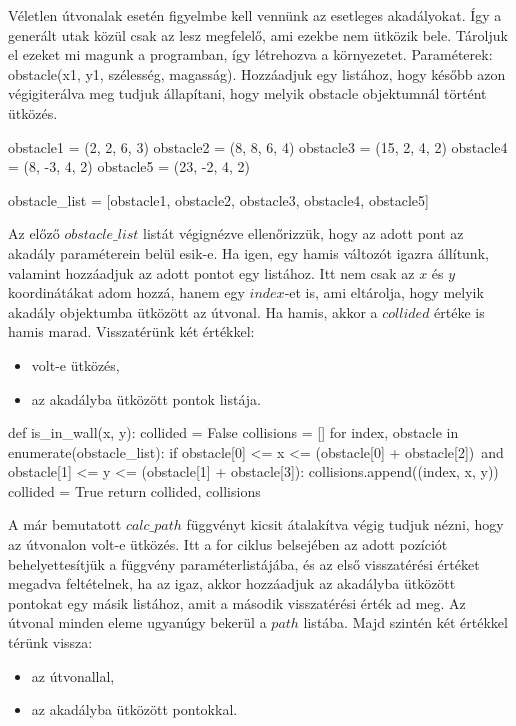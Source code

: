 \newpage


Véletlen útvonalak esetén figyelmbe kell vennünk az esetleges akadályokat. Így a generált utak közül csak az lesz megfelelő, ami ezekbe nem ütközik bele. Tároljuk el ezeket mi magunk a programban, így létrehozva a környezetet. Paraméterek: obstacle(x1, y1, szélesség, magasság). Hozzáadjuk egy listához, hogy később azon végigiterálva meg tudjuk állapítani, hogy melyik obstacle objektumnál történt ütközés.
\begin{python}
obstacle1 = (2, 2, 6, 3)
obstacle2 = (8, 8, 6, 4)
obstacle3 = (15, 2, 4, 2)
obstacle4 = (8, -3, 4, 2)
obstacle5 = (23, -2, 4, 2)

obstacle_list = [obstacle1, obstacle2, obstacle3, obstacle4, obstacle5]
\end{python}
Az előző $ obstacle\_list $ listát végignézve ellenőrizzük, hogy az adott pont az akadály paraméterein belül esik-e. Ha igen, egy hamis változót igazra állítunk, valamint hozzáadjuk az adott pontot egy listához. Itt nem csak az $ x $ és $ y $ koordinátákat adom hozzá, hanem egy $ index $-et is, ami eltárolja, hogy melyik akadály objektumba ütközött az útvonal. Ha hamis, akkor a $ collided $ értéke is hamis marad. Visszatérünk két értékkel:
\begin{itemize}
	\item volt-e ütközés,
	\item az akadályba ütközött pontok listája.
\end{itemize}
\begin{python}
def is_in_wall(x, y):
    collided = False
    collisions = []
    for index, obstacle in enumerate(obstacle_list):
        if obstacle[0] <= x <= (obstacle[0] + obstacle[2])\
                and obstacle[1] <= y <= (obstacle[1] + obstacle[3]):
            collisions.append((index, x, y))
            collided = True
    return collided, collisions
\end{python}
A már bemutatott $calc\_path$ függvényt kicsit átalakítva végig tudjuk nézni, hogy az útvonalon volt-e ütközés. Itt a for ciklus belsejében az adott pozíciót behelyettesítjük a függvény paraméterlistájába, és az első visszatérési értéket megadva feltételnek, ha az igaz, akkor hozzáadjuk az akadályba ütközött pontokat egy másik listához, amit a második visszatérési érték ad meg. Az útvonal minden eleme ugyanúgy bekerül a $ path $ listába. Majd szintén két értékkel térünk vissza:
\begin{itemize}
	\item az útvonallal,
	\item az akadályba ütközött pontokkal.
\end{itemize}
